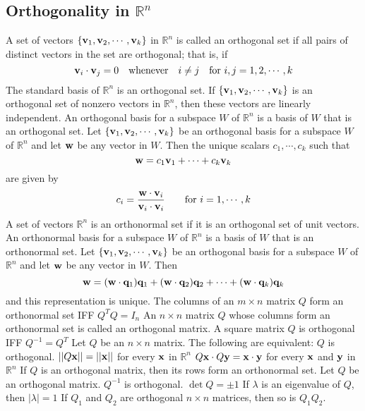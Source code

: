 \documentclass{article}
\begin{document}
        \subsection{Orthogonality in \(\mathbb R^n\)} %
        \begin{outline}
            \1 A set of vectors \(\{\vb v_1,\vb v_2,\cdots,\vb v_k\}\) in \(\mathbb R^n\) is called an orthogonal set if all pairs of distinct vectors in the set are orthogonal; that is, if \[\vb v_i\cdot\vb v_j=0\quad\text{whenever}\quad i\neq j\quad\text{for }i,j=1,2,\cdots,k\]
            \1 The standard basis of \(\mathbb R^n\) is an orthogonal set. 
            \1 If \(\{\vb v_1,\vb v_2,\cdots,\vb v_k\}\) is an orthogonal set of nonzero vectors in \(\mathbb R^n\), then these vectors are linearly independent. 
            \1 An orthogonal basis for a subspace $W$ of \(\mathbb R^n\) is a basis of $W$ that is an orthogonal set. 
            \1 Let \(\{\vb v_1,\vb v_2,\cdots,\vb v_k\}\) be an orthogonal basis for a subspace $W$ of \(\mathbb R^n\) and let \(\vb w\) be any vector in $W$. Then the unique scalars \(c_1,\cdots,c_k\) such that \[\vb w=c_1\vb v_1+\cdots+c_k\vb v_k\] are given by \[c_i=\dfrac{\vb w\cdot\vb v_i}{\vb v_i\cdot \vb v_i}\qquad\text{for }i=1,\cdots,k\] 
            \1 A set of vectors \(\mathbb R^n\) is an orthonormal set if it is an orthogonal set of unit vectors. An orthonormal basis for a subspace $W$ of \(\mathbb R^n\) is a basis of $W$ that is an orthonormal set. 
            \1 Let \(\{\vb v_1,\vb v_2,\cdots,\vb v_k\}\) be an orthogonal basis for a subspace $W$ of \(\mathbb R^n\) and let \(\vb w\) be any vector in $W$. Then \[\vb w=(\vb w\cdot \vb q_1)\vb q_1+(\vb w\cdot\vb q_2)\vb q_2+\cdots+(\vb w\cdot\vb q_k)\vb q_k\] and this representation is unique. 
            \1 The columns of an \(m\times n\) matrix $Q$ form an orthonormal set IFF \(Q^TQ=I_n\)
            \1 An \(n\times n\) matrix $Q$ whose columns form an orthonormal set is called an orthogonal matrix. 
            \1 A square matrix \(Q\) is orthogonal IFF \(Q^{-1}=Q^T\)
            \1 Let $Q$ be an \(n\times n\) matrix. The following are equivalent:
                \2 $Q$ is orthogonal. 
                \2 \(||Q\vb x||=||\vb x||\) for every \(\vb x\) in \(\mathbb R^n\)
                \2 \(Q\vb x\cdot Q\vb y=\vb x\cdot\vb y\) for every \(\vb x\) and \(\vb y\) in \(\mathbb R^n\)
            \1 If $Q$ is an orthogonal matrix, then its rows form an orthonormal set. 
            \1 Let $Q$ be an orthogonal matrix. 
                \2 \(Q^{-1}\) is orthogonal. 
                \2 \(\det Q=\pm 1\)
                \2 If \(\lambda\) is an eigenvalue of $Q$, then \(|\lambda|=1\) 
                \2 If \(Q_1\) and \(Q_2\) are orthogonal \(n\times n\) matrices, then so is \(Q_1Q_2\). 

        \end{outline}
\end{document}
